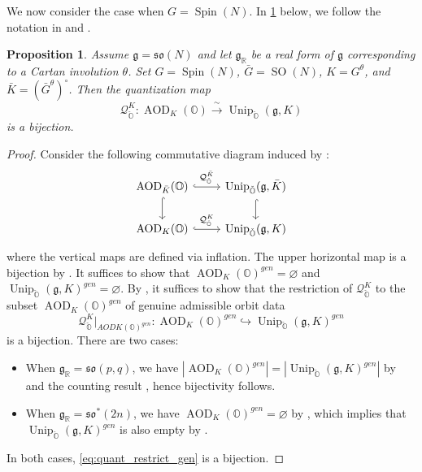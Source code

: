 \documentclass[11pt, a4paper]{amsart}
\newcommand{\g}{\mathfrak{g}}
\newcommand{\orb}{\mathbb{O}}
\newcommand{\ckorb}{\check{\orb}}
\newcommand{\fso}{\mathfrak{so}}
\DeclareMathOperator{\AOD}{AOD}
\DeclareMathOperator{\Unip}{Unip}
\newcommand{\AODK}{\AOD_K}
\newcommand{\UnipOv}{\Unip_{\ckorb}}
\newcommand{\SO}{\operatorname{SO}}
\newcommand{\Spin}{\operatorname{Spin}}
\newcommand{\R}{\mathbb{R}}
\newcommand{\quan}{\mathcal{Q}}
\newtheorem{Prop}[Thm]{Proposition}
\theoremstyle{definition}
\numberwithin{equation}{section}
\begin{document}
We now consider the case when $G=\Spin(N)$. In \cref{prop:counting_spin} below, we follow the notation in  and .

\begin{Prop} \label{prop:counting_spin}
	Assume $\g = \fso(N)$ and let $\g_\R$ be a real form of $\g$ corresponding to a Cartan involution $\theta$. Set $G = \Spin(N)$, $\bar{G} = \SO(N)$, $K = G^\theta$, and $\bar{K} = (\bar{G}^\theta)^\circ$. Then the quantization map 
	\[\quan_{\ckorb}^{K}: \AOD_{K}(\orb) \xrightarrow{\ \sim \ } \UnipOv(\g, K)\]
	is a bijection.
\end{Prop}


\begin{proof}
    Consider the following commutative diagram induced by :
	\[
	\begin{tikzcd}
		\AOD_{\bar{K}}(\orb) \ar[d, hook] \ar[r,hook, "\quan_{\ckorb}^{\bar{K}}"] & \UnipOv(\g, \bar{K}) \ar[d, hook] \\
		\AODK(\orb) \ar[r, hook, "\quan_{\ckorb}^{K}"] & \UnipOv(\g, K) 
	\end{tikzcd}
	\]
	where the vertical maps are defined via inflation. The upper horizontal map is a bijection by .
	It suffices to show that $\AODK(\orb)^{gen} = \varnothing$ and $\UnipOv(\g, K)^{gen} = \varnothing$. By , it suffices to show that the restriction of $\quan_{\ckorb}^{K}$ to the subset $\AODK(\orb)^{gen}$ of genuine admissible orbit data 
    \begin{equation} \label{eq:quant_restrict_gen}
        \quan_{\ckorb}^{K}|_{AODK(\orb)^{gen}}: \AODK(\orb)^{gen} \hookrightarrow \UnipOv(\g, K)^{gen} 
    \end{equation}
    is a bijection. There are two cases: 
    \begin{itemize}[itemindent=*, leftmargin=*]
        \item When $\g_\R = \fso(p,q)$, we have $|\AODK(\orb)^{gen}| = |\UnipOv(\g, K)^{gen}|$ by  and the counting result \cite[Theorem 3]{BMSZ:spin}, hence bijectivity follows. 
        \item When $\g_\R = \fso^*(2n)$, we have $\AODK(\orb)^{gen} = \varnothing$ by , which implies that $\UnipOv(\g, K)^{gen}$ is also empty by . 
    \end{itemize}
    In both cases, \eqref{eq:quant_restrict_gen} is a bijection.
\end{proof}
\end{document}
